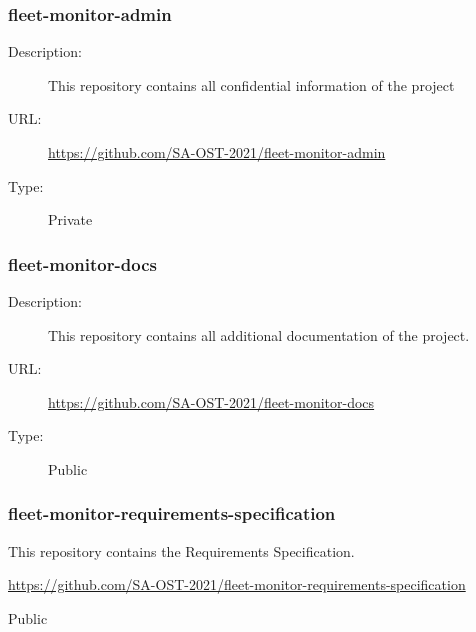\subsubsection{fleet-monitor-admin} \vspace{-0.2cm}
\begin{description}
  \item[Description:] This repository contains all confidential information of the project\vspace{-0.25cm}
  \item[URL:] \url{https://github.com/SA-OST-2021/fleet-monitor-admin}\vspace{-0.25cm}
  \item[Type:] Private\vspace{-0.25cm}
\end{description}

\subsubsection{fleet-monitor-docs} \vspace{-0.2cm}
\begin{description}
  \item[Description:] This repository contains all additional documentation of the project.\vspace{-0.25cm}
  \item[URL:] \url{https://github.com/SA-OST-2021/fleet-monitor-docs}\vspace{-0.25cm}
  \item[Type:] Public\vspace{-0.25cm}
\end{description}

\subsubsection{fleet-monitor-requirements-specification} \vspace{-0.2cm}
\begin{description}
  \hfuzz=35.0pt
  \item[Description:] This repository contains the Requirements Specification.\vspace{-0.25cm}
  \item[URL:] \url{https://github.com/SA-OST-2021/fleet-monitor-requirements-specification}\vspace{-0.25cm}
  \item[Type:] Public\vspace{-0.25cm}
\end{description}

